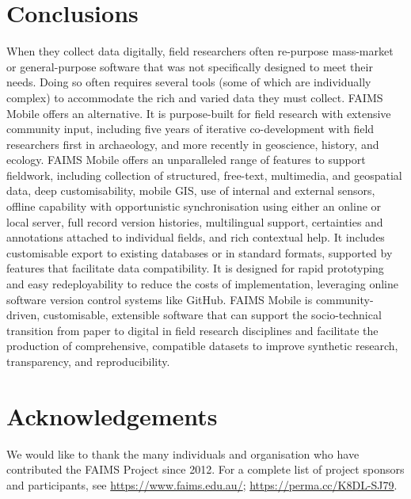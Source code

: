 \documentclass[preprint,12pt, a4paper]{elsarticle}
\begin{document}
\section{Conclusions}

When they collect data digitally, field researchers often re-purpose mass-market or general-purpose software that was not specifically designed to meet their needs. Doing so often requires several tools (some of which are individually complex) to accommodate the rich and varied data they must collect. FAIMS Mobile offers an alternative. It is purpose-built for field research with extensive community input, including five years of iterative co-development with field researchers first in archaeology, and more recently in geoscience, history, and ecology. FAIMS Mobile offers an unparalleled range of features to support fieldwork, including collection of structured, free-text, multimedia, and geospatial data, deep customisability, mobile GIS, use of internal and external sensors, offline capability with opportunistic synchronisation using either an online or local server, full record version histories, multilingual support, certainties and annotations attached to individual fields, and rich contextual help. It includes customisable export to existing databases or in standard formats, supported by features that facilitate data compatibility. It is designed for rapid prototyping and easy redeployability to reduce the costs of implementation, leveraging online software version control systems like GitHub. FAIMS Mobile is community-driven, customisable, extensible software that can support the socio-technical transition from paper to digital in field research disciplines and facilitate the production of comprehensive, compatible datasets to improve synthetic research, transparency, and reproducibility.  


\appendix


\section*{Acknowledgements}


We would like to thank the many individuals and organisation who have contributed the FAIMS Project since 2012. For a complete list of project sponsors and participants, see \url{https://www.faims.edu.au/}; \url{https://perma.cc/K8DL-SJ79}.
\end{document}

